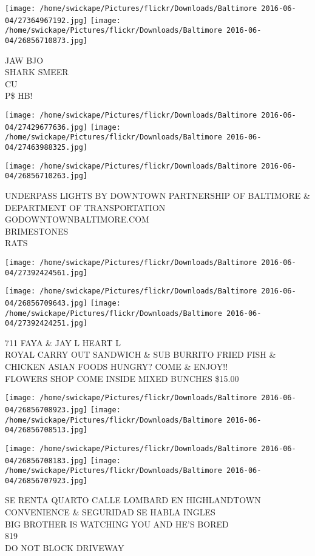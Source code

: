 \documentclass[10pt,letterpaper]{article}
\begin{document}
\texttt{[image: /home/swickape/Pictures/flickr/Downloads/Baltimore 2016-06-04/27364967192.jpg]}
\texttt{[image: /home/swickape/Pictures/flickr/Downloads/Baltimore 2016-06-04/26856710873.jpg]}

JAW BJO\\
SHARK SMEER\\
CU\\
P\$ HB!
\pagebreak

\texttt{[image: /home/swickape/Pictures/flickr/Downloads/Baltimore 2016-06-04/27429677636.jpg]}
\texttt{[image: /home/swickape/Pictures/flickr/Downloads/Baltimore 2016-06-04/27463988325.jpg]}

\texttt{[image: /home/swickape/Pictures/flickr/Downloads/Baltimore 2016-06-04/26856710263.jpg]}

UNDERPASS LIGHTS BY DOWNTOWN PARTNERSHIP OF BALTIMORE \& DEPARTMENT OF TRANSPORTATION GODOWNTOWNBALTIMORE.COM\\
BRIMESTONES\\
RATS
\pagebreak

\texttt{[image: /home/swickape/Pictures/flickr/Downloads/Baltimore 2016-06-04/27392424561.jpg]}

\vspace{0.25in}
\texttt{[image: /home/swickape/Pictures/flickr/Downloads/Baltimore 2016-06-04/26856709643.jpg]}
\texttt{[image: /home/swickape/Pictures/flickr/Downloads/Baltimore 2016-06-04/27392424251.jpg]}

711 FAYA \& JAY L HEART L\\
ROYAL CARRY OUT SANDWICH \& SUB BURRITO FRIED FISH \& CHICKEN ASIAN FOODS HUNGRY?  COME \& ENJOY!!\\
FLOWERS SHOP COME INSIDE MIXED BUNCHES \$15.00
\pagebreak

\texttt{[image: /home/swickape/Pictures/flickr/Downloads/Baltimore 2016-06-04/26856708923.jpg]}
\texttt{[image: /home/swickape/Pictures/flickr/Downloads/Baltimore 2016-06-04/26856708513.jpg]}

\texttt{[image: /home/swickape/Pictures/flickr/Downloads/Baltimore 2016-06-04/26856708183.jpg]}
\texttt{[image: /home/swickape/Pictures/flickr/Downloads/Baltimore 2016-06-04/26856707923.jpg]}

SE RENTA QUARTO CALLE LOMBARD EN HIGHLANDTOWN CONVENIENCE \& SEGURIDAD SE HABLA INGLES\\
BIG BROTHER IS WATCHING YOU AND HE'S BORED\\
819\\
DO NOT BLOCK DRIVEWAY
\pagebreak
\end{document}
